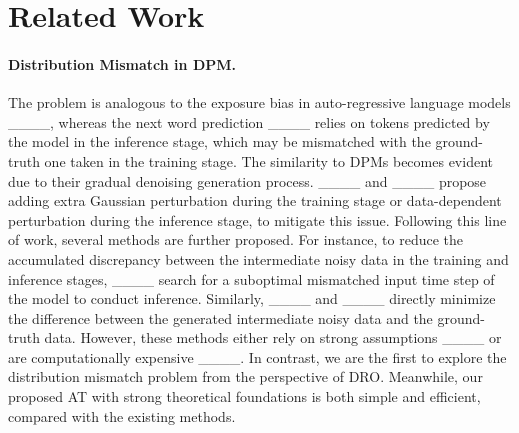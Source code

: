 \section{Related Work}
\paragraph{Distribution Mismatch in DPM.}
The problem is analogous to the exposure bias in auto-regressive language models ____, whereas the next word prediction ____ relies on tokens predicted by the model in the inference stage, which may be mismatched with the ground-truth one taken in the training stage. The similarity to DPMs becomes evident due to their gradual denoising generation process. ____ and ____ propose adding extra Gaussian perturbation during the training stage or data-dependent perturbation during the inference stage, to mitigate this issue. Following this line of work, several methods are further proposed. For instance, to reduce the accumulated discrepancy between the intermediate noisy data in the training and inference stages, ____ search for a suboptimal mismatched input time step of the model to conduct inference. 
Similarly, ____ and ____ directly minimize the difference between the generated intermediate noisy data and the ground-truth data. However, these methods either rely on strong assumptions ____ or are computationally expensive ____.
In contrast, we are the first to explore the distribution mismatch problem from the perspective of DRO. Meanwhile, our proposed AT with strong theoretical foundations is both simple and efficient, compared with the existing methods. 

